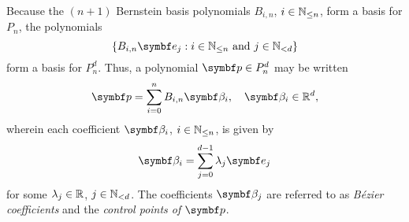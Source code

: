 Because the \((n + 1)\) Bernstein basis polynomials \(B_{i, n}\), \(i \in \mathbb{N}_{\leq n}\), form a basis for \(P_n\),
the polynomials
\[
  \set{B_{i, n} \vct{e}_j : i \in \setnat_{\leq n} \text{ and } j \in \setnat_{< d}}
\]
form a basis for \(P_n^d\). Thus, a polynomial \(\vct{p} \in P_n^d\) may be written
\[
  \vct{p} = \sum_{i = 0}^n B_{i, n} \vct{\beta}_i, \quad \vct{\beta}_i \in \setreal^d,
\]
wherein each coefficient \(\vct{\beta}_i\), \(i \in \mathbb{N}_{\leq n}\), is given by
\[
  \vct{\beta}_i = \sum_{j = 0}^{d - 1} \lambda_j \vct{e}_j
\]
for some \(\lambda_j \in \mathbb{R}\), \(j \in \mathbb{N}_{< d}\). The coefficients \(\vct{\beta}_j\) are referred to as
\emph{Bézier coefficients} and the \emph{control points of \(\vct{p}\)}.

\Edc
